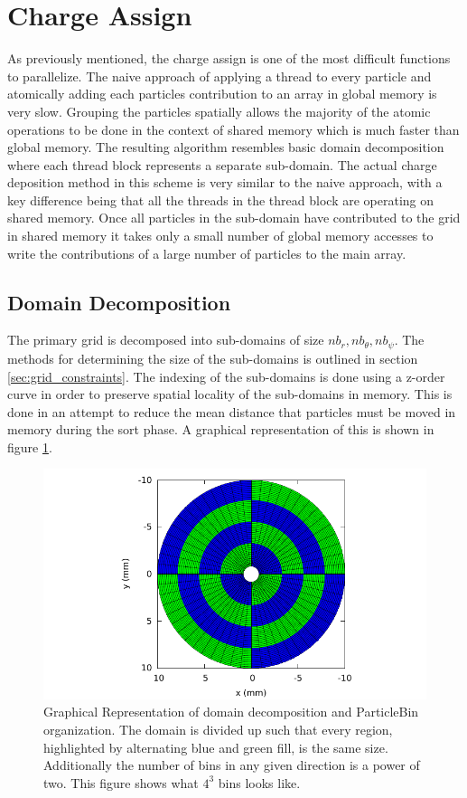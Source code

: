 	\section{Charge Assign}
	\label{sec:charge_assign}
	As previously mentioned, the charge assign is one of the most difficult functions to parallelize. The naive approach of applying a thread to every particle and atomically adding each particles contribution to an array in global memory is very slow. Grouping the particles spatially allows the majority of the atomic operations to be done in the context of shared memory which is much faster than global memory. The resulting algorithm resembles basic domain decomposition where each thread block represents a separate sub-domain. The actual charge deposition method in this scheme is very similar to the naive approach, with a key difference being that all the threads in the thread block are operating on shared memory. Once all particles in the sub-domain have contributed to the grid in shared memory it takes only a small number of global memory accesses to write the contributions of a large number of particles to the main array. 

	\subsection{Domain Decomposition}
		The primary grid is decomposed into sub-domains of size $nb_r, nb_{\theta}, nb_{\psi}$. The methods for determining the size of the sub-domains is outlined in section \ref{sec:grid_constraints}. The indexing of the sub-domains is done using a z-order curve in order to preserve spatial locality of the sub-domains in memory. This is done in an attempt to reduce the mean distance that particles must be moved in memory during the sort phase. A graphical representation of this is shown in figure \ref{fig:domain_decomp}.

\begin{figure}
\begin{center}
\includegraphics[width=5in]{implementation/zorder_sceptic.pdf}
\end{center}
\caption[ParticleBin Organization]{Graphical Representation of domain decomposition and ParticleBin organization. The domain is divided up such that every region, highlighted by alternating blue and green fill, is the same size. Additionally the number of bins in any given direction is a power of two. This figure shows what $4^3$ bins looks like.}
\label{fig:domain_decomp}
\end{figure}

